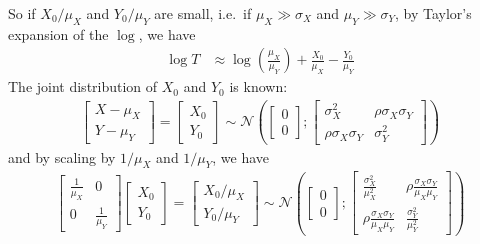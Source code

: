 \documentclass[../../Main_ManuscritThese.tex]{subfiles}
\begin{document}
  So if $X_0 / \mu_X$ and $Y_0/ \mu_Y$ are small, i.e.\ if
  $\mu_X \gg \sigma_X$ and $\mu_Y \gg \sigma_Y$, by Taylor's expansion
  of the $\log$, we have
  \begin{align}
    \log T & \approx \log\left(\frac{\mu_X}{\mu_Y}\right) + \frac{X_0}{\mu_X} - \frac{Y_0}{\mu_Y}
  \end{align}
  The joint distribution of $X_0$ and $Y_0$ is known:
  \begin{align}
    \begin{bmatrix}
      X - \mu_X \\ Y - \mu_Y
    \end{bmatrix} = 
    \begin{bmatrix}
      X_0 \\ Y_0
    \end{bmatrix} \sim \mathcal{N}\left(%
    \begin{bmatrix}
      0 \\ 0
    \end{bmatrix};%
    \begin{bmatrix}
      \sigma^2_X  & \rho \sigma_X \sigma_Y \\
      \rho\sigma_X \sigma_Y & \sigma^2_Y
    \end{bmatrix} \right)%
  \end{align}
  and by scaling by $1/\mu_X$ and $1/\mu_Y$, we have
  \begin{align}
    \begin{bmatrix}
      \frac{1}{\mu_X} & 0 \\
      0 & \frac{1}{\mu_Y}
    \end{bmatrix}
    \begin{bmatrix}
      X_0 \\ Y_0
    \end{bmatrix}=
    \begin{bmatrix}
      X_0/\mu_X \\ Y_0/ \mu_Y
    \end{bmatrix} \sim \mathcal{N}\left(%
    \begin{bmatrix}
      0 \\ 0
    \end{bmatrix};%
    \begin{bmatrix}
      \frac{\sigma^2_X}{\mu_X^2}  & \rho \frac{\sigma_X \sigma_Y}{\mu_X \mu_Y} \\
      \rho \frac{\sigma_X \sigma_Y}{\mu_X \mu_Y}& \frac{\sigma^2_Y}{\mu_Y^2}
    \end{bmatrix} \right)%
  \end{align}
\end{document}
